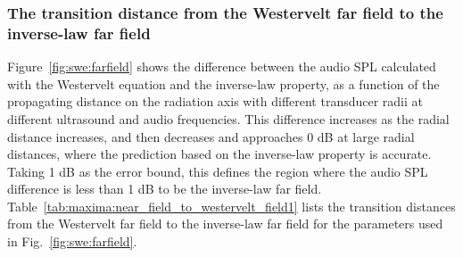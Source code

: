 \subsubsection{The transition distance from the Westervelt far field to the inverse-law far field}
\label{sec:predict_swe_transi_far}
Figure~\ref{fig:swe:farfield} shows the difference between the audio SPL calculated with the Westervelt equation and the inverse-law property, 
as a function of the propagating distance on the radiation axis with different transducer radii at different ultrasound and audio frequencies. 
This difference increases as the radial distance increases, 
and then decreases and approaches 0 dB at large radial distances, 
where the prediction based on the inverse-law property is accurate. 
Taking 1 dB as the error bound, this defines the region where the audio SPL difference is less than 1 dB to be the inverse-law far field. 
Table~\ref{tab:maxima:near_field_to_westervelt_field1} lists the transition distances from the Westervelt far field to the inverse-law far field for the parameters used in Fig.~\ref{fig:swe:farfield}.

